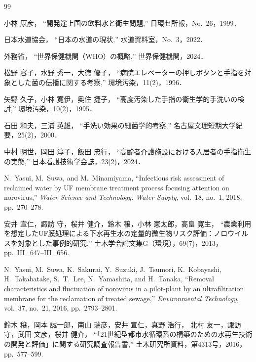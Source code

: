 
\begin{thebibliography}{99}

小林 康彦，
``開発途上国の飲料水と衛生問題,''
日環セ所報，No.~26，1999．

日本水道協会，
``日本の水道の現状,''
水道資料室，No.~3，2022．

外務省，
``世界保健機関（WHO）の概略,''
世界保健機関，2024．

松野 容子，水野 秀一，大徳 優子，
``病院エレベーターの押しボタンと手指を対象とした菌の伝播に関する考察,''
環境汚染，11(2)，1996．

矢野 久子，小林 寛伊，奥住 捷子，
``高度汚染した手指の衛生学的手洗いの検討,''
環境汚染，10(2)，1995．

石田 和夫，三浦 英雄，
``手洗い効果の細菌学的考察,''
名古屋文理短期大学紀要，25(2)，2000．

中村 明世，岡田 淳子，飯田 忠行，
``高齢者介護施設における入居者の手指衛生の実態,''
日本看護技術学会誌，23(2)，2024．

N.~Yasui, M.~Suwa, and M.~Minamiyama,
``Infectious risk assessment of reclaimed water by UF membrane treatment process focusing attention on norovirus,''
\textit{Water Science and Technology: Water Supply},
vol.~18, no.~1, 2018,
pp.~270--278.

安井 宣仁，諏訪 守，桜井 健介，鈴木 穣，小林 憲太郎，高畠 寛生，
``農業利用を想定したUF膜処理による下水再生水の定量的微生物リスク評価：ノロウイルスを対象とした事例的研究,''
土木学会論文集G（環境），69(7)，2013，
pp.~III\_647--III\_656.

N.~Yasui, M.~Suwa, K.~Sakurai, Y.~Suzuki, J.~Tsumori,
K.~Kobayashi, H.~Takabatake, S.~T.~Lee, N.~Yamashita, and H.~Tanaka,
``Removal characteristics and fluctuation of norovirus in a pilot-plant by an ultrafiltration membrane for the reclamation of treated sewage,''
\textit{Environmental Technology},
vol.~37, no.~21, 2016,
pp.~2793--2801.

鈴木 穣，岡本 誠一郎，南山 瑞彦，安井 宣仁，真野 浩行，
北村 友一，諏訪 守，武田 文彦，桜井 健介，
``「21世紀型都市水循環系の構築のための水再生技術の開発と評価」に関する研究調査報告書,''
土木研究所資料，第4313号，2016，
pp.~577--599.

\end{thebibliography}
